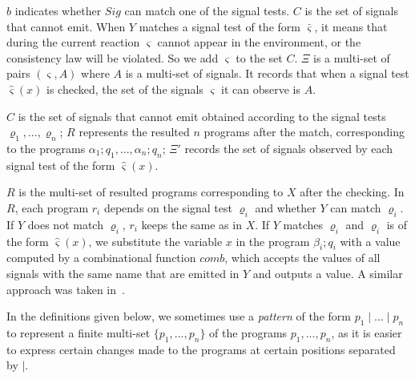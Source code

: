 \documentclass{fcs}
\newcommand{\sig}[0]{\varsigma}
\DeclareMathOperator{\seq}{;}
\DeclareMathOperator{\sep}{|}
\newcommand{\comb}[0]{\mathit{comb}}
\newcommand{\Sigs}[0]{\mathit{Sig}}
\newcommand{\SV}[0]{\Xi}
\begin{document}
$b$ indicates whether $\Sigs$ can match one of the signal tests.
$C$ is the set of signals that cannot emit.
When $Y$ matches a signal test of the form $\bar{\sig}$, it means that during the current reaction $\sig$ cannot appear in the environment, or the consistency law will be violated.
So we add $\sig$ to the set $C$.
$\SV$ is a multi-set of pairs $(\sig, A)$ where $A$ is a multi-set of signals.
It records that when a signal test $\hat{\sig}(x)$ is checked, the set of the signals $\sig$ it can observe is $A$.

\ifx
$C$ is the set of signals that cannot emit obtained according to the signal tests $\varrho_1,...,\varrho_n$;
$R$ represents the resulted $n$ programs after the match, corresponding to the programs $\alpha_1\seq q_1,...,\alpha_n\seq q_n$;
$\SV'$ records the set of signals observed by each signal test of the form $\hat{\sig}(x)$.
\fi

$R$ is the multi-set of resulted programs corresponding to $X$ after the checking.
In $R$, each program $r_i$ depends on the signal test $\varrho_i$ and whether $Y$ can match $\varrho_i$.
If $Y$ does not match $\varrho_i$, $r_i$ keeps the same as in $X$.
If $Y$ matches $\varrho_i$ and $\varrho_i$ is of the form $\hat{\sig}(x)$, we substitute the variable $x$ in the program $\beta_i\seq q_i$ with a value computed by a combinational function $\comb$, which accepts the values of all signals with the same name that are emitted in $Y$ and outputs a value.
A similar approach was taken in~\cite{Berry92}.

\fi

In the definitions given below, we sometimes use a \emph{pattern} of the form $p_1\sep...\sep p_n$ to represent a finite multi-set $\{p_1,...,p_n\}$ of the programs $p_1,...,p_n$,
as it is easier to express certain changes made to the programs at certain positions separated by $\sep$.
\end{document}
